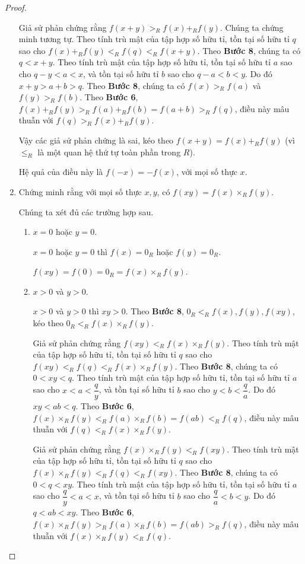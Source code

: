 \begin{proof}
\begin{enumerate}[label={\textbf{Bước \arabic*.}},itemindent=1cm,start=8]
              Giả sử phản chứng rằng $f(x + y) >_{R} f(x) +_{R} f(y)$. Chúng ta chứng minh tương tự. Theo tính trù mật của tập hợp số hữu tỉ, tồn tại số hữu tỉ $q$ sao cho $f(x) +_{R} f(y) <_{R} f(q) <_{R} f(x+y)$. Theo \textbf{Bước 8}, chúng ta có $q < x + y$. Theo tính trù mật của tập hợp số hữu tỉ, tồn tại số hữu tỉ $a$ sao cho $q - y < a < x$, và tồn tại số hữu tỉ $b$ sao cho $q - a < b < y$. Do đó $x + y > a + b > q$.  Theo \textbf{Bước 8}, chúng ta có $f(x) >_{R} f(a)$ và $f(y) >_{R} f(b)$. Theo \textbf{Bước 6}, $f(x) +_{R} f(y) >_{R} f(a) +_{R} f(b) = f(a + b) >_{R} f(q)$, điều này mâu thuẫn với $f(q) >_{R} f(x) +_{R} f(y)$.

              Vậy các giả sử phản chứng là sai, kéo theo $f(x + y) = f(x) +_{R} f(y)$ (vì $\leq_{R}$ là một quan hệ thứ tự toàn phần trong $R$).

              Hệ quả của điều này là $f(-x) = -f(x)$, với mọi số thực $x$.
        \item Chứng minh rằng với mọi số thực $x, y$, có $f(xy) = f(x) \times_{R} f(y)$.

              Chúng ta xét đủ các trường hợp sau.
              \begin{enumerate}[label={\textbf{Trường hợp \arabic*.}},itemindent=2cm]
                  \item $x = 0$ hoặc $y = 0$.

                        $x = 0$ hoặc $y = 0$ thì $f(x) = 0_{R}$ hoặc $f(y) = 0_{R}$.

                        $f(xy) = f(0) = 0_{R} = f(x)\times_{R} f(y)$.
                  \item $x > 0$ và $y > 0$.

                        $x > 0$ và $y > 0$ thì $xy > 0$. Theo \textbf{Bước 8}, $0_{R} <_{R} f(x), f(y), f(xy)$, kéo theo $0_{R} <_{R} f(x)\times_{R} f(y)$.

                        Giả sử phản chứng rằng $f(xy) <_{R} f(x)\times_{R} f(y)$. Theo tính trù mật của tập hợp số hữu tỉ, tồn tại số hữu tỉ $q$ sao cho $f(xy) <_{R} f(q) <_{R} f(x)\times_{R} f(y)$. Theo \textbf{Bước 8}, chúng ta có $0 < xy < q$. Theo tính trù mật của tập hợp số hữu tỉ, tồn tại số hữu tỉ $a$ sao cho $x < a < \dfrac{q}{y}$, và tồn tại số hữu tỉ $b$ sao cho $y < b < \dfrac{q}{a}$. Do đó $xy < ab < q$. Theo \textbf{Bước 6}, $f(x)\times_{R} f(y) <_{R} f(a)\times_{R} f(b) = f(ab) <_{R} f(q)$, điều này mâu thuẫn với $ f(q) <_{R} f(x)\times_{R} f(y)$.

                        Giả sử phản chứng rằng $f(x)\times_{R} f(y) <_{R} f(xy)$. Theo tính trù mật của tập hợp số hữu tỉ, tồn tại số hữu tỉ $q$ sao cho $f(x)\times_{R} f(y) <_{R} f(q) <_{R} f(xy)$. Theo \textbf{Bước 8}, chúng ta có $0 < q < xy$. Theo tính trù mật của tập hợp số hữu tỉ, tồn tại số hữu tỉ $a$ sao cho $\dfrac{q}{y} < a < x$, và tồn tại số hữu tỉ $b$ sao cho $\dfrac{q}{a} < b < y$. Do đó $q < ab < xy$. Theo \textbf{Bước 6}, $f(x)\times_{R} f(y) >_{R} f(a)\times_{R} f(b) = f(ab) >_{R} f(q)$, điều này mâu thuẫn với $f(x)\times_{R} f(y) <_{R} f(q)$.


\end{enumerate}
\end{enumerate}
\end{proof}
